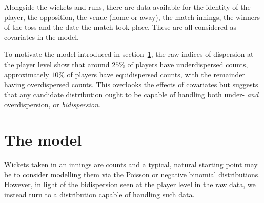 \documentclass{statsoc}
\newcommand{\pmp}[1]{\textcolor{blue}{#1}}
\newcommand{\numtestbowlers}{2148}
\begin{document}

Alongside the wickets and runs, there are data available for the identity of the player, the opposition, the venue (home or away), the match innings, the winners of the toss and the date the match took place. These are all considered as covariates in the model. 

To motivate the model introduced in section~\ref{sec:model}, the raw indices of dispersion at the player level show that around $25\%$ of players have underdispersed counts, approximately $10\%$ of players have equidispersed counts, with the remainder having overdispersed counts. This overlooks the effects of covariates but suggests that any candidate distribution ought to be capable of handling both under- \textit{and} overdispersion, or \textit{bidispersion}.


\section{The model}\label{sec:model}
Wickets taken in an innings are counts and a typical, natural starting point may be 
to consider modelling them via the Poisson or negative binomial distributions. However, in light of the bidispersion seen at the player level in the raw data, we instead turn to a distribution capable of handling such data.
\end{document}
